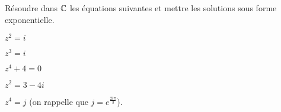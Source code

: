 \documentclass[a4paper, 11pt]{article}
\begin{document}
\begin{exercice}  \;
R\'esoudre dans $\mathbb{C}$ les \'equations suivantes et mettre les solutions sous forme exponentielle.
\begin{enumerate}
\begin{minipage}[t]{0.45\textwidth}
\item $z^2=i$
\item $z^3=i$
\item $z^4+4=0$ 
\end{minipage}
\begin{minipage}[t]{0.45\textwidth}
\item $z^2=3-4i$
\item $z^4=j$ (on rappelle que $j=e^{\frac{2i\pi}{3}}$).
\end{minipage}
\end{enumerate}
\end{exercice}
\end{document}
